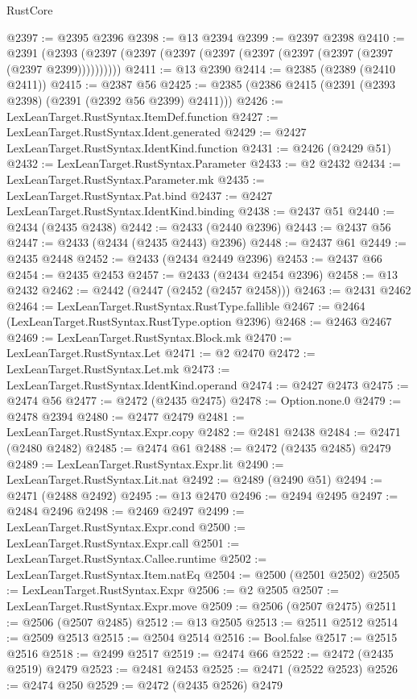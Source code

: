 \begin{lexlean}{RustCore}
\begin{coremodule}
@2397 := @2395 @2396
@2398 := @13 @2394
@2399 := @2397 @2398
@2410 := @2391 (@2393 (@2397 (@2397 (@2397 (@2397 (@2397 (@2397 (@2397 (@2397 (@2397 @2399))))))))))
@2411 := @13 @2390
@2414 := @2385 (@2389 (@2410 @2411))
@2415 := @2387 @56
@2425 := @2385 (@2386 @2415 (@2391 (@2393 @2398) (@2391 (@2392 @56 @2399) @2411)))
@2426 := LexLeanTarget.RustSyntax.ItemDef.function
@2427 := LexLeanTarget.RustSyntax.Ident.generated
@2429 := @2427 LexLeanTarget.RustSyntax.IdentKind.function
@2431 := @2426 (@2429 @51)
@2432 := LexLeanTarget.RustSyntax.Parameter
@2433 := @2 @2432
@2434 := LexLeanTarget.RustSyntax.Parameter.mk
@2435 := LexLeanTarget.RustSyntax.Pat.bind
@2437 := @2427 LexLeanTarget.RustSyntax.IdentKind.binding
@2438 := @2437 @51
@2440 := @2434 (@2435 @2438)
@2442 := @2433 (@2440 @2396)
@2443 := @2437 @56
@2447 := @2433 (@2434 (@2435 @2443) @2396)
@2448 := @2437 @61
@2449 := @2435 @2448
@2452 := @2433 (@2434 @2449 @2396)
@2453 := @2437 @66
@2454 := @2435 @2453
@2457 := @2433 (@2434 @2454 @2396)
@2458 := @13 @2432
@2462 := @2442 (@2447 (@2452 (@2457 @2458)))
@2463 := @2431 @2462
@2464 := LexLeanTarget.RustSyntax.RustType.fallible
@2467 := @2464 (LexLeanTarget.RustSyntax.RustType.option @2396)
@2468 := @2463 @2467
@2469 := LexLeanTarget.RustSyntax.Block.mk
@2470 := LexLeanTarget.RustSyntax.Let
@2471 := @2 @2470
@2472 := LexLeanTarget.RustSyntax.Let.mk
@2473 := LexLeanTarget.RustSyntax.IdentKind.operand
@2474 := @2427 @2473
@2475 := @2474 @56
@2477 := @2472 (@2435 @2475)
@2478 := Option.none.{0}
@2479 := @2478 @2394
@2480 := @2477 @2479
@2481 := LexLeanTarget.RustSyntax.Expr.copy
@2482 := @2481 @2438
@2484 := @2471 (@2480 @2482)
@2485 := @2474 @61
@2488 := @2472 (@2435 @2485) @2479
@2489 := LexLeanTarget.RustSyntax.Expr.lit
@2490 := LexLeanTarget.RustSyntax.Lit.nat
@2492 := @2489 (@2490 @51)
@2494 := @2471 (@2488 @2492)
@2495 := @13 @2470
@2496 := @2494 @2495
@2497 := @2484 @2496
@2498 := @2469 @2497
@2499 := LexLeanTarget.RustSyntax.Expr.cond
@2500 := LexLeanTarget.RustSyntax.Expr.call
@2501 := LexLeanTarget.RustSyntax.Callee.runtime
@2502 := LexLeanTarget.RustSyntax.Item.natEq
@2504 := @2500 (@2501 @2502)
@2505 := LexLeanTarget.RustSyntax.Expr
@2506 := @2 @2505
@2507 := LexLeanTarget.RustSyntax.Expr.move
@2509 := @2506 (@2507 @2475)
@2511 := @2506 (@2507 @2485)
@2512 := @13 @2505
@2513 := @2511 @2512
@2514 := @2509 @2513
@2515 := @2504 @2514
@2516 := Bool.false
@2517 := @2515 @2516
@2518 := @2499 @2517
@2519 := @2474 @66
@2522 := @2472 (@2435 @2519) @2479
@2523 := @2481 @2453
@2525 := @2471 (@2522 @2523)
@2526 := @2474 @250
@2529 := @2472 (@2435 @2526) @2479

\end{coremodule}
\end{lexlean}
